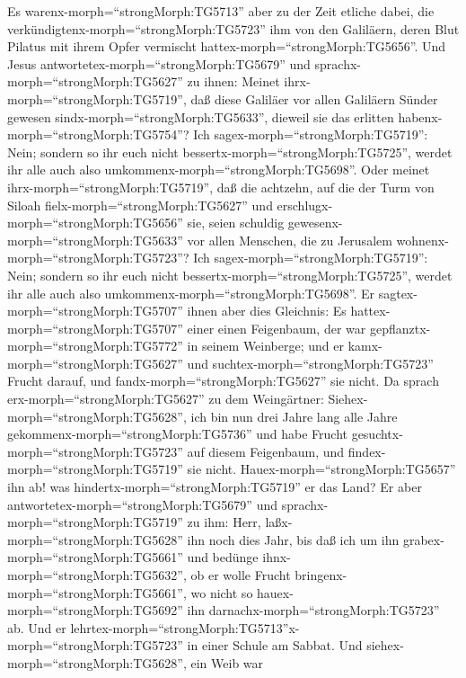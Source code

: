  Es warenx-morph=``strongMorph:TG5713'' aber zu der Zeit
etliche dabei, die verkündigtenx-morph=``strongMorph:TG5723'' ihm von
den Galiläern, deren Blut Pilatus mit ihrem Opfer vermischt
hattex-morph=``strongMorph:TG5656''.  Und Jesus
antwortetex-morph=``strongMorph:TG5679'' und
sprachx-morph=``strongMorph:TG5627'' zu ihnen: Meinet
ihrx-morph=``strongMorph:TG5719'', daß diese Galiläer vor allen
Galiläern Sünder gewesen sindx-morph=``strongMorph:TG5633'', dieweil sie
das erlitten habenx-morph=``strongMorph:TG5754''?  Ich
sagex-morph=``strongMorph:TG5719'': Nein; sondern so ihr euch nicht
bessertx-morph=``strongMorph:TG5725'', werdet ihr alle auch also
umkommenx-morph=``strongMorph:TG5698''.  Oder meinet
ihrx-morph=``strongMorph:TG5719'', daß die achtzehn, auf die der Turm
von Siloah fielx-morph=``strongMorph:TG5627'' und
erschlugx-morph=``strongMorph:TG5656'' sie, seien schuldig
gewesenx-morph=``strongMorph:TG5633'' vor allen Menschen, die zu
Jerusalem wohnenx-morph=``strongMorph:TG5723''?  Ich
sagex-morph=``strongMorph:TG5719'': Nein; sondern so ihr euch nicht
bessertx-morph=``strongMorph:TG5725'', werdet ihr alle auch also
umkommenx-morph=``strongMorph:TG5698''.  Er
sagtex-morph=``strongMorph:TG5707'' ihnen aber dies Gleichnis: Es
hattex-morph=``strongMorph:TG5707'' einer einen Feigenbaum, der war
gepflanztx-morph=``strongMorph:TG5772'' in seinem Weinberge; und er
kamx-morph=``strongMorph:TG5627'' und
suchtex-morph=``strongMorph:TG5723'' Frucht darauf, und
fandx-morph=``strongMorph:TG5627'' sie nicht.  Da sprach
erx-morph=``strongMorph:TG5627'' zu dem Weingärtner:
Siehex-morph=``strongMorph:TG5628'', ich bin nun drei Jahre lang alle
Jahre gekommenx-morph=``strongMorph:TG5736'' und habe Frucht
gesuchtx-morph=``strongMorph:TG5723'' auf diesem Feigenbaum, und
findex-morph=``strongMorph:TG5719'' sie nicht.
Hauex-morph=``strongMorph:TG5657'' ihn ab! was
hindertx-morph=``strongMorph:TG5719'' er das Land?  Er aber
antwortetex-morph=``strongMorph:TG5679'' und
sprachx-morph=``strongMorph:TG5719'' zu ihm: Herr,
laßx-morph=``strongMorph:TG5628'' ihn noch dies Jahr, bis daß ich um ihn
grabex-morph=``strongMorph:TG5661'' und bedünge
ihnx-morph=``strongMorph:TG5632'',  ob er wolle Frucht
bringenx-morph=``strongMorph:TG5661'', wo nicht so
hauex-morph=``strongMorph:TG5692'' ihn
darnachx-morph=``strongMorph:TG5723'' ab.  Und er
lehrtex-morph=``strongMorph:TG5713''x-morph=``strongMorph:TG5723'' in
einer Schule am Sabbat.  Und
siehex-morph=``strongMorph:TG5628'', ein Weib war
